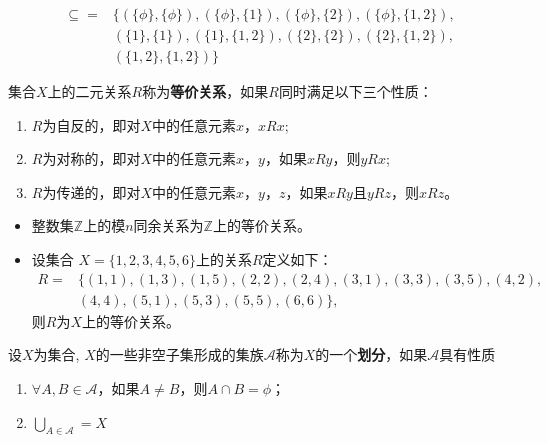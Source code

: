 \documentclass{beamer}
\begin{document}
\begin{CJK*}{UTF8}{gbsn}
\begin{frame}
\begin{Ex}
  \begin{equation*}
    \begin{split}
 \subseteq =& \{
 (\{\phi\},\{\phi\}),(\{\phi\},\{1\}),(\{\phi\},\{2\}),(\{\phi\},\{1,2\}),\\
 &(\{1\},\{1\}),(\{1\},\{1,2\}),(\{2\},\{2\}),(\{2\},\{1,2\}),\\
 &(\{1,2\},\{1,2\})
\}
    \end{split}
  \end{equation*}
\end{Ex}
\end{frame}
\begin{frame}
    \begin{Def}
    集合$X$上的二元关系$R$称为{\bfseries 等价关系}，如果$R$同时满足以下三个性质：
    \begin{enumerate}
    \item $R$为自反的，即对$X$中的任意元素$x$，$xRx$;
    \item $R$为对称的，即对$X$中的任意元素$x$，$y$，如果$xRy$，则$yRx$;
    \item $R$为传递的，即对$X$中的任意元素$x$，$y$，$z$，如果$xRy$且$yRz$，则$xRz$。
    \end{enumerate}
  \end{Def}
  \begin{Ex}
    \begin{itemize}
    \item     整数集$\mathbb{Z}$上的模$n$同余关系为$\mathbb{Z}$上的等价关系。
    \item 设集合
    $X=\{1,2,3,4,5,6 \}$上的关系$R$定义如下：
    \begin{align*}
      R=&\{(1,1),(1,3),(1,5),(2,2),(2,4),(3,1),(3,3),(3,5),(4,2),\\
      &(4,4),(5,1),(5,3),(5,5),(6,6)\},
    \end{align*}
      则$R$为$X$上的等价关系。
    \end{itemize}
  \end{Ex}
\end{frame}

\begin{frame}
     \begin{Def}
    设$X$为集合, $X$的一些非空子集形成的集族$\mathscr{A}$称为$X$的一个{\bfseries 划分}，如果$\mathscr{A}$具有性质
    \begin{enumerate}
    \item $\forall A, B \in \mathscr{A}$，如果$A \neq B$，则$A \cap B = \phi$；
      \item $\bigcup_{A \in \mathscr{A}} = X$
    \end{enumerate}
  \end{Def}


\end{frame}
\end{CJK*}
\end{document}
